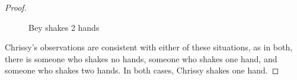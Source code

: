 \documentclass[article, 12pt]{article}
\theoremstyle{definition}
\begin{document}
\begin{proof}
\begin{figure}[H]
\begin{minipage}[t]{.4\textwidth}
                \caption{Bey shakes 2 hands}
            \end{minipage}
        \end{figure}
        Chrissy's observations are consistent with either of these situations, as in both, there is someone who shakes no hands, someone who shakes one hand, and someone who shakes two hands. In both cases, Chrissy shakes one hand.
    \end{proof}
\end{document}
